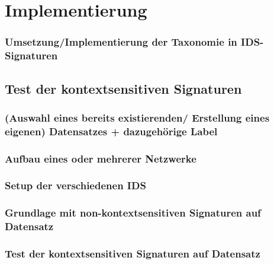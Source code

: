 \chapter{Implementierung}%
\label{cha:implementation}



		\subsection{ Umsetzung/Implementierung der Taxonomie in  IDS-Signaturen}
\section{Test der kontextsensitiven Signaturen}

\subsection{ (Auswahl eines bereits existierenden/ Erstellung eines eigenen) Datensatzes + dazugehörige Label }
\subsection{ Aufbau eines oder mehrerer Netzwerke  } 
\subsection{ Setup der verschiedenen IDS }
\subsection{ Grundlage mit non-kontextsensitiven Signaturen auf Datensatz }
\subsection{ Test der kontextsensitiven Signaturen auf Datensatz} 
